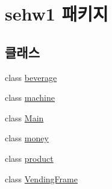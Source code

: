 \hypertarget{namespacesehw1}{}\section{sehw1 패키지}
\label{namespacesehw1}
\subsection*{클래스}
\begin{DoxyCompactItemize}
\item 
class \hyperlink{classsehw1_1_1beverage}{beverage}
\item 
class \hyperlink{classsehw1_1_1machine}{machine}
\item 
class \hyperlink{classsehw1_1_1_main}{Main}
\item 
class \hyperlink{classsehw1_1_1money}{money}
\item 
class \hyperlink{classsehw1_1_1product}{product}
\item 
class \hyperlink{classsehw1_1_1_vending_frame}{Vending\+Frame}
\end{DoxyCompactItemize}
